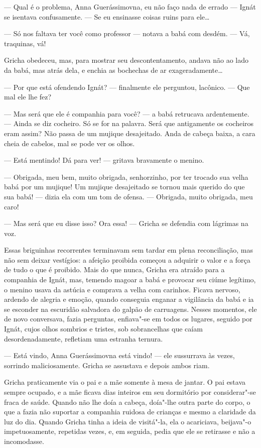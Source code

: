--- Qual é o problema, Anna Guerássimovna, eu não faço nada de errado
--- Ignát se isentava confusamente. --- Se eu ensinasse coisas ruins
para ele\ldots{}

--- Só nos faltava ter você como professor --- notava a babá com desdém.
--- Vá, traquinas, vá!

Gricha obedeceu, mas, para mostrar seu descontentamento, andava não ao
lado da babá, mas atrás dela, e enchia as bochechas de ar
exageradamente\ldots{}

--- Por que está ofendendo Ignát? --- finalmente ele perguntou,
lacônico. --- Que mal ele lhe fez?

--- Mas será que ele é companhia para você? --- a babá retrucava
ardentemente. --- Ainda se diz cocheiro. Só se for na palavra. Será que
antigamente os cocheiros eram assim? Não passa de um mujique
desajeitado. Anda de cabeça baixa, a cara cheia de cabelos, mal se pode
ver os olhos.

--- Está mentindo! Dá para ver! --- gritava bravamente o menino.

--- Obrigada, meu bem, muito obrigada, senhorzinho, por ter trocado sua
velha babá por um mujique! Um mujique desajeitado se tornou mais querido
do que sua babá! --- dizia ela com um tom de ofensa. --- Obrigada, muito
obrigada, meu caro!

--- Mas será que eu disse isso? Ora essa! --- Gricha se defendia com
lágrimas na voz.

Essas briguinhas recorrentes terminavam sem tardar em plena
reconciliação, mas não sem deixar vestígios: a afeição proibida começou
a adquirir o valor e a força de tudo o que é proibido. Mais do que
nunca, Gricha era atraído para a companhia de Ignát, mas, temendo magoar
a babá e provocar seu ciúme legítimo, o menino usava da astúcia e
comprava a velha com carinhos. Ficava nervoso, ardendo de alegria e
emoção, quando conseguia enganar a vigilância da babá e ia se esconder
na escuridão salvadora do galpão de carruagens. Nesses momentos, ele de
novo conversava, fazia perguntas, enfiava"-se em todos os lugares,
seguido por Ignát, cujos olhos sombrios e tristes, sob sobrancelhas que
caíam desordenadamente, refletiam uma estranha ternura.

--- Está vindo, Anna Guerássimovna está vindo! --- ele sussurrava às
vezes, sorrindo maliciosamente. Gricha se assustava e depois ambos riam.

\pagebreak
\asterisc

Gricha praticamente via o pai e a mãe somente à mesa de jantar. O pai
estava sempre ocupado, e a mãe ficava dias inteiros em seu dormitório
por considerar"-se fraca de saúde. Quando não lhe doía a cabeça, doía"-lhe
outra parte do corpo, o que a fazia não suportar a companhia ruidosa de
crianças e mesmo a claridade da luz do dia. Quando Gricha tinha a ideia
de visitá"-la, ela o acariciava, beijava"-o impetuosamente, repetidas
vezes, e, em seguida, pedia que ele se retirasse e não a incomodasse.

